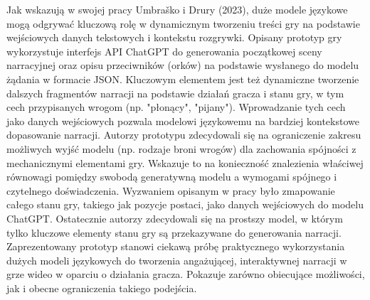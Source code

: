 Jak wskazują w swojej pracy Umbraško i Drury (2023)\cite{chatgpt_narrative},
duże modele językowe mogą odgrywać kluczową rolę w
dynamicznym tworzeniu treści gry na podstawie wejściowych danych tekstowych i kontekstu rozgrywki.
Opisany prototyp gry wykorzystuje interfejs API ChatGPT do generowania początkowej sceny narracyjnej oraz
opisu przeciwników (orków) na podstawie wysłanego do modelu żądania w formacie JSON. Kluczowym
elementem jest też dynamiczne tworzenie dalszych fragmentów narracji na podstawie działań gracza i
stanu gry, w tym cech przypisanych wrogom (np. "płonący", "pijany"). Wprowadzanie tych cech jako danych
wejściowych pozwala modelowi językowemu na bardziej kontekstowe dopasowanie narracji.
Autorzy prototypu zdecydowali się na ograniczenie zakresu możliwych wyjść modelu (np. rodzaje broni
wrogów) dla zachowania spójności z mechanicznymi elementami gry. Wskazuje to na konieczność znalezienia
właściwej równowagi pomiędzy swobodą generatywną modelu a wymogami spójnego i czytelnego doświadczenia.
Wyzwaniem opisanym w pracy było zmapowanie całego stanu gry, takiego jak pozycje postaci, jako danych
wejściowych do modelu ChatGPT. Ostatecznie autorzy zdecydowali się na prostszy model, w którym tylko
kluczowe elementy stanu gry są przekazywane do generowania narracji. Zaprezentowany
prototyp stanowi ciekawą próbę praktycznego wykorzystania dużych modeli językowych do tworzenia
angażującej, interaktywnej narracji w grze wideo w oparciu o działania gracza. Pokazuje zarówno
obiecujące możliwości, jak i obecne ograniczenia takiego podejścia.\cite{chatgpt_narrative}

